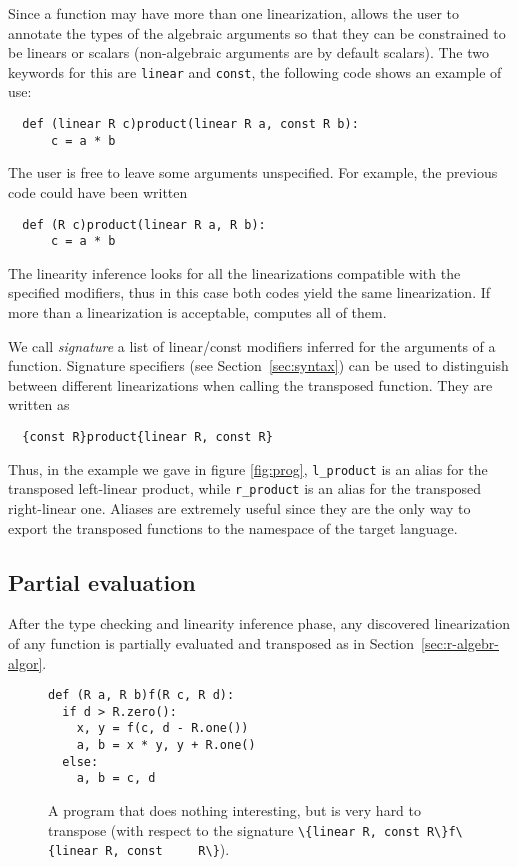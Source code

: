 Since a function may have more than one linearization, \tALpy{} allows
the user to annotate the types of the algebraic arguments so that they
can be constrained to be linears or scalars (non-algebraic arguments
are by default scalars). The two keywords for this are
\lstinline{linear} and \lstinline{const}, the following code shows an
example of use:
\begin{lstlisting}
  def (linear R c)product(linear R a, const R b):
      c = a * b
\end{lstlisting}

The user is free to leave some arguments unspecified. For example, the
previous code could have been written
\begin{lstlisting}
  def (R c)product(linear R a, R b):
      c = a * b
\end{lstlisting}
The linearity inference looks for all the linearizations compatible
with the specified modifiers, thus in this case both codes yield the
same linearization. If more than a linearization is acceptable,
\tALpy{} computes all of them.

We call \emph{signature} a list of linear/const
modifiers inferred for the arguments of a function. Signature
specifiers (see Section~\ref{sec:syntax}) can be used to distinguish
between different linearizations when calling the transposed
function. They are written as
\begin{lstlisting}
  {const R}product{linear R, const R}
\end{lstlisting}

Thus, in the example we gave in figure \ref{fig:prog},
\lstinline+l_product+ is an alias for the transposed left-linear
product, while \lstinline+r_product+ is an alias for the transposed
right-linear one. Aliases are extremely useful since they are the only
way to export the transposed functions to the namespace of the target
language.




\subsection{Partial evaluation}
\label{sec:partial-evaluation-1}
After the type checking and linearity inference phase, any discovered
linearization of any function is partially evaluated and transposed as
in Section~\ref{sec:r-algebr-algor}.


\begin{figure}[b]
  \centering
\begin{lstlisting}[frame=single,frameround=tttt]
def (R a, R b)f(R c, R d):
  if d > R.zero():
    x, y = f(c, d - R.one())
    a, b = x * y, y + R.one()
  else:
    a, b = c, d
\end{lstlisting}
  \caption{\label{fig:bad}A \tALpy{} program that does nothing
    interesting, but is very hard to transpose (with respect to the
    signature \lstinline+\{linear R, const R\}f\{linear R, const
    R\}+).}
\end{figure}


